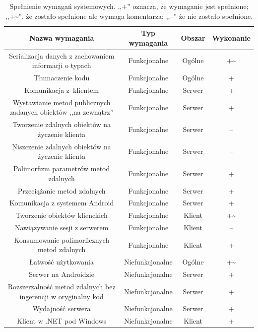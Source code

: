 \begin{table}[htbp]
	\begin{adjustbox}{center}
		\begin{tabular}{ @{}| c | c | c | c | }
			\hline
				\textbf{Nazwa wymagania} & \textbf{Typ wymagania} & \textbf{Obszar} & \textbf{Wykonanie}\\
				\hline \hline
				Serializacja danych z zachowaniem informacji o typach & Funkcjonalne & Ogólne & +\textasciitilde\\
				\hline
				Tłumaczenie kodu & Funkcjonalne & Ogólne & +\\
				\hline
				
				Komunikacja z~klientem & Funkcjonalne & Serwer & +\\
				\hline
				Wystawianie metod publicznych zadanych obiektów ,,na zewnątrz'' & Funkcjonalne & Serwer & + \\
				\hline
				Tworzenie zdalnych obiektów na życzenie klienta & Funkcjonalne & Serwer & -- \\
				\hline
				Niszczenie zdalnych obiektów na życzenie klienta & Funkcjonalne & Serwer & -- \\
				\hline
				Polimorfizm parametrów metod zdalnych & Funkcjonalne & Serwer & + \\
				\hline
				Przeciążanie metod zdalnych & Funkcjonalne & Serwer & + \\
				\hline
				Komunikacja z systemem Android & Funkcjonalne & Serwer & + \\
				\hline
				
				Tworzenie obiektów klienckich & Funkcjonalne & Klient & +\textasciitilde \\
				\hline
				Nawiązywanie sesji z serwerem & Funkcjonalne & Klient & -- \\
				\hline
				Konsumowanie polimorficznych metod zdalnych & Funkcjonalne & Klient & + \\
				\hline
				
				Łatwość użytkowania & Niefunkcjonalne & Ogólne & +\textasciitilde \\
				\hline
				Serwer na Androidzie & Niefunkcjonalne & Serwer & + \\
				\hline
				Rozszerzalność metod zdalnych bez ingerencji w oryginalny kod & Niefunkcjonalne & Serwer & + \\
				\hline
				Wydajność serwera & Niefunkcjonalne & Serwer & + \\
				\hline
				Klient w .NET pod Windows & Niefunkcjonalne & Klient & + \\
				\hline
		\end{tabular}
	\end{adjustbox}
	\caption[Spełnienie wymagań systemowych.]{Spełnienie wymagań systemowych. ,,+'' oznacza, że wymaganie jest spełnione; ,,+\textasciitilde'', że zostało spełnione ale wymaga komentarza; ,,--'' że nie zostało spełnione.}
	\label{tab:requirements-fulfilment}
\end{table}

